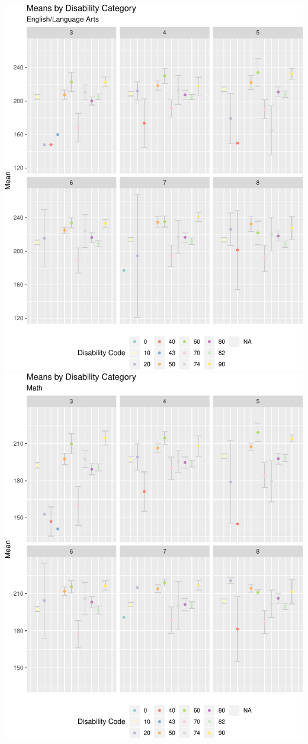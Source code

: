 \documentclass[]{article}
\begin{document}
\includegraphics{Critical_Element_4_files/figure-latex/plots38-1.pdf}
\includegraphics{Critical_Element_4_files/figure-latex/plots38-2.pdf}
\end{document}
